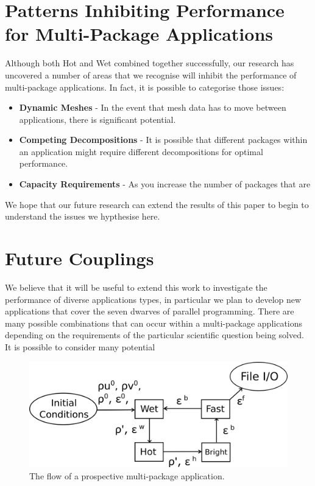 \documentclass[runningheads,a4paper]{llncs}
\begin{document}
\section{Patterns Inhibiting Performance for Multi-Package Applications}

Although both Hot and Wet combined together successfully, our research has uncovered a number of areas that we recognise will inhibit the performance of multi-package applications. In fact, it is possible to categorise those issues:

\begin{itemize}
  \item \textbf{Dynamic Meshes} - In the event that mesh data has to move between applications, there is significant potential.
  \item \textbf{Competing Decompositions} - It is possible that different packages within an application might require different decompositions for optimal performance.
  \item \textbf{Capacity Requirements} - As you increase the number of packages that are 
\end{itemize}

We hope that our future research can extend the results of this paper to begin to understand the issues we hypthesise here.

\section{Future Couplings}

We believe that it will be useful to extend this work to investigate the performance of diverse applications types, in particular we plan to develop new applications that cover the seven dwarves of parallel programming. There are many possible combinations that can occur within a multi-package applications depending on the requirements of the particular scientific question being solved. It is possible to consider many potential 

\begin{figure}
\centering
\includegraphics[width=1.0\linewidth]{all-four-flow}
\caption{The flow of a prospective multi-package application.}
\label{fig:multi-package-flow}
\end{figure}
\end{document}
